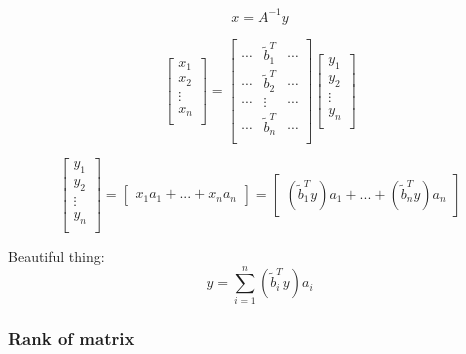 \documentclass[10pt,letterpaper]{article}
\begin{document}
\begin{itemize}
\begin{itemize}
\[
x=A^{-1} y
\]

\[
\begin{bmatrix}
  x_1      \\
  x_2      \\
  \vdots   \\
  x_n      \\
\end{bmatrix}
=
\begin{bmatrix}
  \cdots & \tilde b^T_1 & \cdots \\
  \cdots & \tilde b^T_2 & \cdots \\
  \cdots & \vdots       & \cdots \\
  \cdots & \tilde b^T_n & \cdots \\
\end{bmatrix}
\begin{bmatrix}
  y_1      \\
  y_2      \\
  \vdots   \\
  y_n      \\
\end{bmatrix}
\]

\[
\begin{bmatrix}
  y_1      \\
  y_2      \\
  \vdots   \\
  y_n      \\
\end{bmatrix}
=
\begin{bmatrix}
x_1 a_1 + ... + x_n a_n
\end{bmatrix}
=
\begin{bmatrix}
(\tilde b^T_1 y) a_1 + ... + (\tilde b^T_n y) a_n
\end{bmatrix}
\]

Beautiful thing:
\[
y=\sum_{i=1}^n (\tilde b_i ^T y) a_i
\]

\end{itemize} %
\end{itemize} %
\subsubsection{Rank of matrix}
\label{sec-2_2_5}
\end{document}
